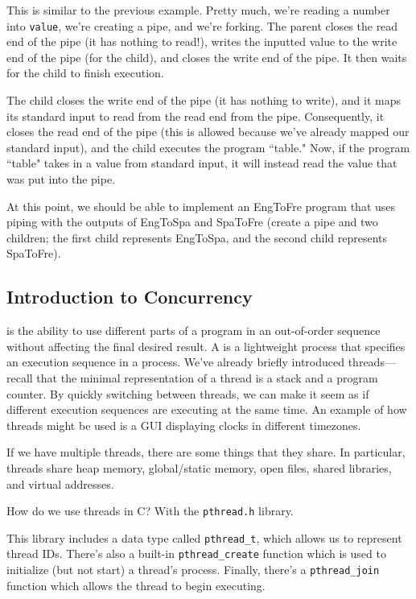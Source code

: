 
This is similar to the previous example. Pretty much, we're reading a number into \verb!value!, we're creating a pipe, and we're forking. The parent closes the read end of the pipe (it has nothing to read!), writes the inputted value to the write end of the pipe (for the child), and closes the write end of the pipe. It then waits for the child to finish execution.

The child closes the write end of the pipe (it has nothing to write), and it maps its standard input to read from the read end from the pipe. Consequently, it closes the read end of the pipe (this is allowed because we've already mapped our standard input), and the child executes the program ``table." Now, if the program ``table" takes in a value from standard input, it will instead read the value that was put into the pipe.


At this point, we should be able to implement an EngToFre program that uses piping with the outputs of EngToSpa and SpaToFre (create a pipe and two children; the first child represents EngToSpa, and the second child represents SpaToFre). 


\subsection{Introduction to Concurrency}
 is the ability to use different parts of a program in an out-of-order sequence without affecting the final desired result. A  is a lightweight process that specifies an execution sequence in a process. We've already briefly introduced threads---recall that the minimal representation of a thread is a stack and a program counter. By quickly switching between threads, we can make it seem as if different execution sequences are executing at the same time. An example of how threads might be used is a GUI displaying clocks in different timezones.  

If we have multiple threads, there are some things that they share. In particular, threads share heap memory, global/static memory, open files, shared libraries, and virtual addresses.

How do we use threads in C? With the \verb!pthread.h! library. 

This library includes a data type called \verb!pthread_t!, which allows us to represent thread IDs. There's also a built-in \verb!pthread_create! function which is used to initialize (but not start) a thread's process. Finally, there's a \verb!pthread_join! function which allows the thread to begin executing.

